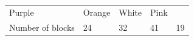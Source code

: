 \begin{enumerate}[noitemsep, label=\textbf{\arabic*}. ]
{\begin{tabular}[t]{|l|l|l|l|l|}
        Purple &
        Orange &
        White &
        Pink%
     \tabularnewline\cline{1-1}\cline{2-2}\cline{3-3}\cline{4-4}\cline{5-5}
        Number of
blocks &
        24 &
        32 &
        41 &
        19%
     \tabularnewline\cline{1-1}\cline{2-2}\cline{3-3}\cline{4-4}\cline{5-5}
    \end{tabular}} %
        \addtolength{\mytableboxheight}{\mytableboxdepth}
\end{enumerate}
